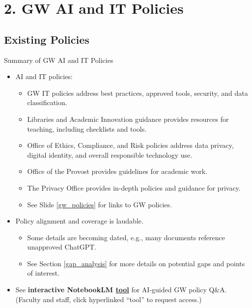 \documentclass[aspectratio=169]{beamer}
\begin{document}
\section{2. GW AI and IT Policies}

\subsection*{Existing Policies}

\begin{frame}{Summary of GW AI and IT Policies}

    \footnotesize

    \begin{itemize}
        \item AI and IT policies:
        \begin{itemize}
            \item GW IT policies address best practices, approved tools, security, and data classification. 
            \item Libraries and Academic Innovation guidance provides resources for teaching, including checklists and tools. 
            \item Office of Ethics, Compliance, and Risk policies address data privacy, digital identity, and overall responsible technology use. 
            \item Office of the Provost provides guidelines for academic work. 
            \item The Privacy Office provides in-depth policies and guidance for privacy. 
            \item See Slide \ref{gw_policies} for links to GW policies. 
        \end{itemize}
        \item Policy alignment and coverage is laudable.
        \begin{itemize}
            \item Some details are becoming dated, e.g., many documents reference unapproved ChatGPT.
            \item See Section \ref{gap_analysis} for more details on potential gaps and points of interest.
        \end{itemize}
        \item See \textbf{interactive NotebookLM \href{https://notebooklm.google.com/notebook/d6709e69-032a-427c-bc07-8f23bf19c184}{tool}} for AI-guided GW policy Q\&A. (Faculty and staff, click hyperlinked ``tool'' to request access.)
    \end{itemize}

\end{frame}
\end{document}
